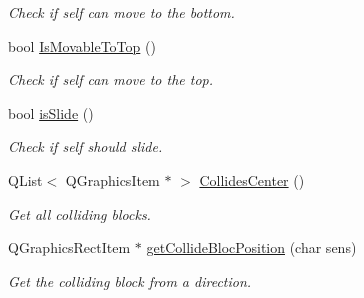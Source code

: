 \begin{DoxyCompactItemize}
\begin{DoxyCompactList}\small\item\em Check if self can move to the bottom. \end{DoxyCompactList}\item 
bool \hyperlink{class_b___movable_a68bb6a98d031f9495cdeb80b9aa325c4}{Is\+Movable\+To\+Top} ()
\begin{DoxyCompactList}\small\item\em Check if self can move to the top. \end{DoxyCompactList}\item 
bool \hyperlink{class_b___movable_a44d1413ec8bceda3b1a50c673b429d03}{is\+Slide} ()
\begin{DoxyCompactList}\small\item\em Check if self should slide. \end{DoxyCompactList}\item 
Q\+List$<$ Q\+Graphics\+Item $\ast$ $>$ \hyperlink{class_b___movable_ac84271d347bea1604a96c930b8bffe17}{Collides\+Center} ()
\begin{DoxyCompactList}\small\item\em Get all colliding blocks. \end{DoxyCompactList}\item 
Q\+Graphics\+Rect\+Item $\ast$ \hyperlink{class_b___movable_aef4ab507bbb425d12f9c585ba8aae2db}{get\+Collide\+Bloc\+Position} (char sens)
\begin{DoxyCompactList}\small\item\em Get the colliding block from a direction. \end{DoxyCompactList}\end{DoxyCompactItemize}
